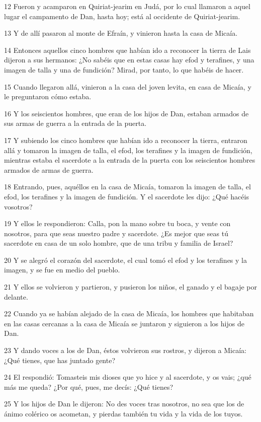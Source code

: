 \par 12 Fueron y acamparon en Quiriat-jearim en Judá, por lo cual llamaron a aquel lugar el campamento de Dan, hasta hoy; está al occidente de Quiriat-jearim.
\par 13 Y de allí pasaron al monte de Efraín, y vinieron hasta la casa de Micaía.
\par 14 Entonces aquellos cinco hombres que habían ido a reconocer la tierra de Lais dijeron a sus hermanos: ¿No sabéis que en estas casas hay efod y terafines, y una imagen de talla y una de fundición? Mirad, por tanto, lo que habéis de hacer.
\par 15 Cuando llegaron allá, vinieron a la casa del joven levita, en casa de Micaía, y le preguntaron cómo estaba.
\par 16 Y los seiscientos hombres, que eran de los hijos de Dan, estaban armados de sus armas de guerra a la entrada de la puerta.
\par 17 Y subiendo los cinco hombres que habían ido a reconocer la tierra, entraron allá y tomaron la imagen de talla, el efod, los terafines y la imagen de fundición, mientras estaba el sacerdote a la entrada de la puerta con los seiscientos hombres armados de armas de guerra.
\par 18 Entrando, pues, aquéllos en la casa de Micaía, tomaron la imagen de talla, el efod, los terafines y la imagen de fundición. Y el sacerdote les dijo: ¿Qué hacéis vosotros?
\par 19 Y ellos le respondieron: Calla, pon la mano sobre tu boca, y vente con nosotros, para que seas nuestro padre y sacerdote. ¿Es mejor que seas tú sacerdote en casa de un solo hombre, que de una tribu y familia de Israel?
\par 20 Y se alegró el corazón del sacerdote, el cual tomó el efod y los terafines y la imagen, y se fue en medio del pueblo.
\par 21 Y ellos se volvieron y partieron, y pusieron los niños, el ganado y el bagaje por delante.
\par 22 Cuando ya se habían alejado de la casa de Micaía, los hombres que habitaban en las casas cercanas a la casa de Micaía se juntaron y siguieron a los hijos de Dan.
\par 23 Y dando voces a los de Dan, éstos volvieron sus rostros, y dijeron a Micaía: ¿Qué tienes, que has juntado gente?
\par 24 El respondió: Tomasteis mis dioses que yo hice y al sacerdote, y os vais; ¿qué más me queda? ¿Por qué, pues, me decís: ¿Qué tienes?
\par 25 Y los hijos de Dan le dijeron: No des voces tras nosotros, no sea que los de ánimo colérico os acometan, y pierdas también tu vida y la vida de los tuyos.
